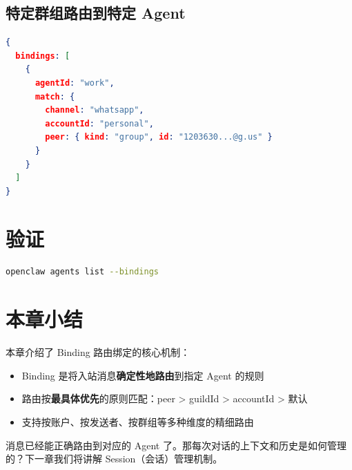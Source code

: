 \subsection{特定群组路由到特定 Agent}

\begin{lstlisting}[language=json]
{
  bindings: [
    {
      agentId: "work",
      match: {
        channel: "whatsapp",
        accountId: "personal",
        peer: { kind: "group", id: "1203630...@g.us" }
      }
    }
  ]
}
\end{lstlisting}

\section{验证}

\begin{lstlisting}[language=bash]
openclaw agents list --bindings
\end{lstlisting}

\section{本章小结}

本章介绍了 Binding 路由绑定的核心机制：

\begin{itemize}
  \item Binding 是将入站消息\textbf{确定性地路由}到指定 Agent 的规则
  \item 路由按\textbf{最具体优先}的原则匹配：peer > guildId > accountId > 默认
  \item 支持按账户、按发送者、按群组等多种维度的精细路由
\end{itemize}

\noindent 消息已经能正确路由到对应的 Agent 了。那每次对话的上下文和历史是如何管理的？下一章我们将讲解 Session（会话）管理机制。
